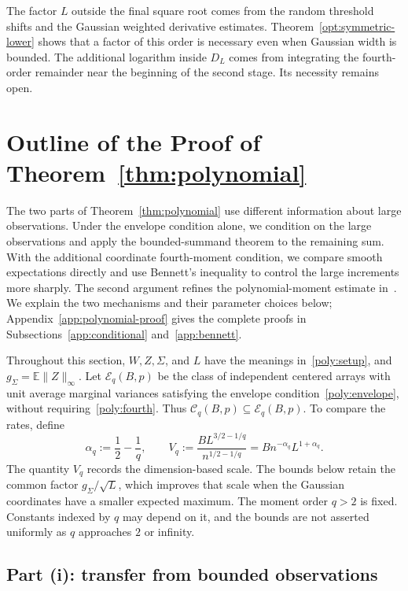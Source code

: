 \documentclass[11pt,letterpaper,twoside,leqno]{article}
\theoremstyle{bookplain}
\theoremstyle{bookremark}
\newcommand{\E}{\mathbb E}
\begin{document}
{
The factor \(L\) outside the final square root comes from the
random threshold shifts and the Gaussian weighted derivative estimates.
Theorem~\ref{opt:symmetric-lower} shows that a factor of this order
is necessary even when Gaussian width is bounded. The additional
logarithm inside \(D_L\) comes from integrating the fourth-order
remainder near the beginning of the second stage. Its necessity
remains open.
}

\section{Outline of the Proof of Theorem~\ref*{thm:polynomial}}\label{sec:poly}

The two parts of Theorem~\ref{thm:polynomial} use different information
about large observations. Under the envelope condition alone, we
condition on the large observations and apply the bounded-summand
theorem to the remaining sum. With the additional coordinate
fourth-moment condition, we compare smooth expectations directly and
use Bennett's inequality to control the large increments more sharply.
The second argument refines the polynomial-moment estimate
in~\cite{CCKK2022}. We explain the two mechanisms and their parameter
choices below; Appendix~\ref{app:polynomial-proof} gives the complete
proofs in Subsections~\ref{app:conditional} and~\ref{app:bennett}.

Throughout this section, $W,Z,\Sigma$, and $L$ have the meanings
in~\eqref{poly:setup}, and $g_\Sigma=\E\|Z\|_\infty$.
Let $\mathcal E_q(B,p)$ be the class of independent centered arrays
with unit average marginal variances satisfying the envelope
condition~\eqref{poly:envelope}, without requiring~\eqref{poly:fourth}.
Thus $\mathcal C_q(B,p)\subseteq\mathcal E_q(B,p)$.
To compare the rates, define
\begin{equation}
 \alpha_q:=\frac12-\frac1q,\qquad
 V_q:=\frac{B L^{3/2-1/q}}{n^{1/2-1/q}}
      =Bn^{-\alpha_q}L^{1+\alpha_q}.
 \label{poly:rates}
\end{equation}
The quantity $V_q$ records the dimension-based scale. The bounds
below retain the common factor $g_\Sigma/\sqrt L$, which improves
that scale when the Gaussian coordinates have a smaller expected
maximum. The moment order $q>2$ is fixed. Constants indexed by $q$
may depend on it, and the bounds are not asserted uniformly as $q$
approaches $2$ or infinity.

\subsection{\texorpdfstring{{Part (i): transfer from bounded observations}}{Part (i): transfer from bounded observations}}\label{poly:transfer-sec}
\end{document}
